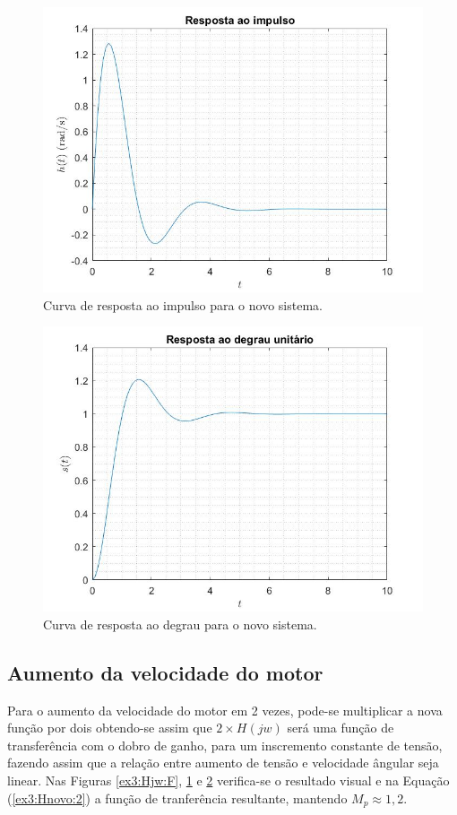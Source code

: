 \documentclass[a4paper,12pt,oneside,openany,table,xcdraw]{article}
\begin{document}
\vspace{0.2cm}
\begin{figure}[H]
\centering
\includegraphics[width=14cm]{ex3-htf}
\caption{Curva de resposta ao impulso para o novo sistema.}
\label{ex3:ht:F}
\end{figure}

\vspace{0.2cm}
\begin{figure}[H]
\centering
\includegraphics[width=14cm]{ex3-stf}
\caption{Curva de resposta ao degrau para o novo sistema.}
\label{ex3:st:F}
\end{figure}


\vspace{0.3cm}
\subsection{Aumento da velocidade do motor}
Para o aumento da velocidade do motor em 2 vezes, pode-se multiplicar a nova função por dois obtendo-se assim que $2\times H(jw)$ será uma função de transferência com o dobro de ganho, para um inscremento constante de tensão, fazendo assim que a relação entre aumento de tensão e velocidade ângular seja linear. Nas Figuras \ref{ex3:Hjw:F}, \ref{ex3:ht:F} e \ref{ex3:st:F} verifica-se o resultado visual e na Equação (\ref{ex3:Hnovo:2}) a função de tranferência resultante, mantendo $M_p \approx 1,2$.
\end{document}
